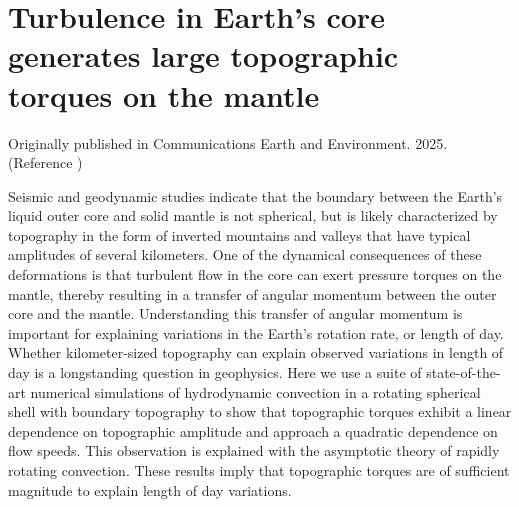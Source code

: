 \chapter{Turbulence in Earth's core generates large topographic torques on the mantle}
\label{Oliver_2025}



 \begin{affils}

 \end{affils}
 Originally published in Communications Earth and Environment. 2025. (Reference \citep{tO25})

\begin{chapterabstract}
	Seismic and geodynamic studies indicate that the boundary between the Earth's liquid outer core and solid mantle is not spherical, but is likely characterized by topography in the form of inverted mountains and valleys that have typical amplitudes of several kilometers.  
	One of the dynamical consequences of these deformations is that turbulent flow in the core can exert pressure torques on the mantle, thereby resulting in a transfer of angular momentum between the outer core and the mantle. Understanding this transfer of angular momentum is important for explaining variations in the Earth's rotation rate, or length of day.
	Whether kilometer-sized topography can explain observed variations in length of day is a longstanding question in geophysics. 
	\textcolor{\revtxt}{Here we use a suite of state-of-the-art numerical simulations of hydrodynamic convection in a rotating spherical shell with boundary topography to show that topographic torques exhibit a linear dependence on topographic amplitude and approach a quadratic dependence on flow speeds. This observation is explained with the asymptotic theory of rapidly rotating convection.
These results imply that topographic torques are of sufficient magnitude to explain length of day variations.}

\end{chapterabstract}

